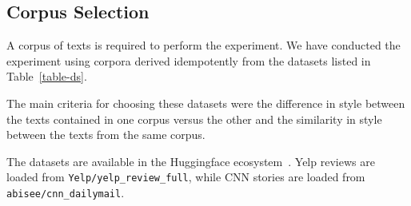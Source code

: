 \documentclass[a4paper,twoside]{article}
\begin{document}
\subsection{Corpus Selection}\label{ds-selection}

A corpus of texts is required to perform the experiment.
We have conducted the experiment using corpora derived idempotently from the
datasets listed in Table~\ref{table-ds}.

The main criteria for choosing these datasets were the difference in style
between the texts contained in one corpus versus the other and the similarity in
style between the texts from the same corpus.

\begin{table}[ht!]
    \setlength\tabcolsep{6pt}
    \centering
    \caption{Source Datasets}\label{table-ds}
\end{table}

The datasets are available in the Huggingface
ecosystem~\cite{lhoest-etal-2021-datasets}.
Yelp reviews are loaded from \texttt{Yelp/yelp\_review\_full}, while CNN stories
are loaded from \texttt{abisee/cnn\_dailymail}.
\end{document}
